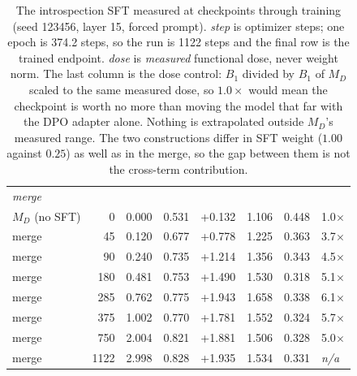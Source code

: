 \begin{table}[!ht]
\begin{tabular}{lrrrrrrl}
\midrule
\multicolumn{8}{l}{\emph{merge}} \\
$M_D$ (no SFT) & 0 & 0.000 & 0.531 & +0.132 & 1.106 & 0.448 & 1.0$\times$ \\
merge & 45 & 0.120 & 0.677 & +0.778 & 1.225 & 0.363 & 3.7$\times$ \\
merge & 90 & 0.240 & 0.735 & +1.214 & 1.356 & 0.343 & 4.5$\times$ \\
merge & 180 & 0.481 & 0.753 & +1.490 & 1.530 & 0.318 & 5.1$\times$ \\
merge & 285 & 0.762 & 0.775 & +1.943 & 1.658 & 0.338 & 6.1$\times$ \\
merge & 375 & 1.002 & 0.770 & +1.781 & 1.552 & 0.324 & 5.7$\times$ \\
merge & 750 & 2.004 & 0.821 & +1.881 & 1.506 & 0.328 & 5.0$\times$ \\
merge & 1122 & 2.998 & 0.828 & +1.935 & 1.534 & 0.331 & \textit{n/a} \\
\bottomrule
\end{tabular}
\caption{The introspection SFT measured at checkpoints through training (seed 123456, layer 15, forced prompt). \emph{step} is optimizer steps; one epoch is 374.2 steps, so the run is 1122 steps and the final row is the trained endpoint. \emph{dose} is \emph{measured} functional dose, never weight norm. The last column is the dose control: $B_1$ divided by $B_1$ of $M_D$ scaled to the same measured dose, so $1.0\times$ would mean the checkpoint is worth no more than moving the model that far with the DPO adapter alone. Nothing is extrapolated outside $M_D$'s measured range. The two constructions differ in SFT weight ($1.00$ against $0.25$) as well as in the merge, so the gap between them is not the cross-term contribution.}
\label{tab:oct-sft-curve}
\end{table}
